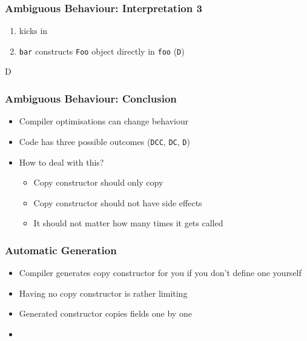 \begin{frame}
  \frametitle{Ambiguous Behaviour: Interpretation 3}
  \begin{enumerate}
    \item {} kicks in
    \item \texttt{bar} constructs \texttt{Foo} object directly in \texttt{foo} (\texttt{D})
  \end{enumerate}
  \vskip5mm
  \begin{center}
    \ttfamily D
  \end{center}
\end{frame}

\begin{frame}
  \frametitle{Ambiguous Behaviour: Conclusion}
  \begin{itemize}
    \item Compiler optimisations can change behaviour
    \item Code has three possible outcomes (\texttt{DCC}, \texttt{DC}, \texttt{D})
    \item How to deal with this?
          \begin{itemize}
            \item Copy constructor should only copy
            \item Copy constructor should not have side effects
            \item It should not matter how many times it gets called
          \end{itemize}
  \end{itemize}
\end{frame}

\begin{frame}
  \frametitle{Automatic Generation}
  \begin{itemize}
    \item Compiler generates copy constructor for you if you don't define one yourself
    \item Having no copy constructor is rather limiting
    \item Generated constructor copies fields one by one
    \item {}
  \end{itemize}
\end{frame}


